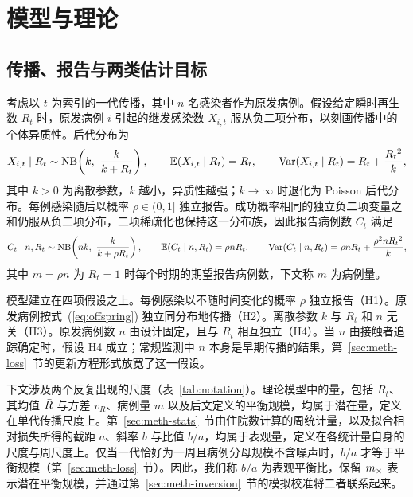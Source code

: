 \section{模型与理论}
\label{sec:background}

\subsection{传播、报告与两类估计目标}
\label{sec:bg-model}

考虑以 $t$ 为索引的一代传播，其中 $n$ 名感染者作为原发病例。假设给定瞬时再生数 $R_t$ 时，原发病例 $i$ 引起的继发感染数 $X_{i,t}$ 服从负二项分布，以刻画传播中的个体异质性\citep{lloydsmith2005superspreading}。后代分布为
\begin{equation}
  X_{i,t}\mid R_t \sim \NB\!\left(k,\ \frac{k}{k+R_t}\right),\qquad
  \E(X_{i,t}\mid R_t)=R_t,\qquad \Var(X_{i,t}\mid R_t)=R_t+\frac{R_t{}^2}{k},
  \label{eq:offspring}
\end{equation}
其中 $k>0$ 为离散参数，$k$ 越小，异质性越强；$k\to\infty$ 时退化为 Poisson 后代分布。每例感染随后以概率 $\rho\in(0,1]$ 独立报告。成功概率相同的独立负二项变量之和仍服从负二项分布，二项稀疏化也保持这一分布族，因此报告病例数 $C_t$ 满足
\begin{equation}
  C_t\mid n,R_t \sim \NB\!\left(nk,\ \frac{k}{k+\rho R_t}\right),\qquad
  \E(C_t\mid n,R_t)=\rho nR_t,\qquad
  \Var(C_t\mid n,R_t)=\rho nR_t+\frac{\rho^2nR_t{}^2}{k},
  \label{eq:observed}
\end{equation}
其中 $m=\rho n$ 为 $R_t=1$ 时每个时期的期望报告病例数，下文称 $m$ 为病例量。

模型建立在四项假设之上。每例感染以不随时间变化的概率 $\rho$ 独立报告（H1）。原发病例按式~(\ref{eq:offspring}) 独立同分布地传播（H2）。离散参数 $k$ 与 $R_t$ 和 $n$ 无关（H3）。原发病例数 $n$ 由设计固定，且与 $R_t$ 相互独立（H4）。当 $n$ 由接触者追踪确定时，假设 H4 成立；常规监测中 $n$ 本身是早期传播的结果，第~\ref{sec:meth-loss}~节的更新方程形式放宽了这一假设。

下文涉及两个反复出现的尺度（表~\ref{tab:notation}）。理论模型中的量，包括 $R_t$、其均值 $\bar{R}$ 与方差 $v_R$、病例量 $m$ 以及后文定义的平衡规模，均属于潜在量，定义在单代传播尺度上。第~\ref{sec:meth-stats}~节由住院数计算的周统计量，以及拟合相对损失所得的截距 $a$、斜率 $b$ 与比值 $b/a$，均属于表观量，定义在各统计量自身的尺度与周尺度上。仅当一代恰好为一周且病例分母规模不含噪声时，$b/a$ 才等于平衡规模（第~\ref{sec:meth-loss}~节）。因此，我们称 $b/a$ 为表观平衡比，保留 $m_{\times}$ 表示潜在平衡规模，并通过第~\ref{sec:meth-inversion}~节的模拟校准将二者联系起来。

